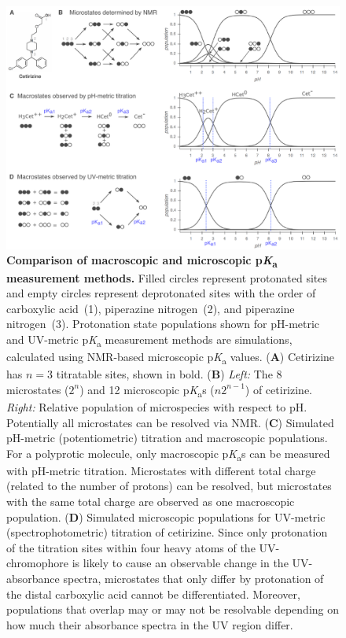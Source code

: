 \documentclass[9pt,lineno]{elife}
\newcommand{\pKa}{p\textit{K}\textsubscript{a}}
\begin{document}
\begin{figure}
\begin{center}
\includegraphics[width=1.00\linewidth]{figures/microscopic_vs_macroscopic_populations_figure.pdf}
\caption{{\bf Comparison of macroscopic and microscopic \pKa{} measurement methods.}  
Filled circles represent protonated sites and empty circles represent deprotonated sites with the order of carboxylic acid~(1), piperazine nitrogen~(2), and piperazine nitrogen~(3). 
Protonation state populations shown for pH-metric and UV-metric \pKa{} measurement methods are simulations, calculated using NMR-based microscopic \pKa{} values.
(\textbf{A}) Cetirizine has $n = $3 titratable sites, shown in bold. 
(\textbf{B}) \emph{Left:} The 8 microstates ($2^n$) and 12 microscopic \pKa{}s ($n 2^{n-1}$) of cetirizine. 
\emph{Right:} Relative population of microspecies with respect to pH. 
Potentially all microstates can be resolved via NMR. 
(\textbf{C}) Simulated pH-metric (potentiometric) titration and macroscopic populations. 
For a polyprotic molecule, only macroscopic \pKa{}s can be measured with pH-metric titration. 
Microstates with different total charge (related to the number of protons) can be resolved, but microstates with the same total charge are observed as one macroscopic population. 
(\textbf{D}) Simulated microscopic populations for UV-metric (spectrophotometric) titration of cetirizine. 
Since only protonation of the titration sites within four heavy atoms of the UV-chromophore is likely to cause an observable change in the UV-absorbance spectra, microstates that only differ by protonation of the distal carboxylic acid cannot be differentiated. 
Moreover, populations that overlap may or may not be resolvable depending on how much their absorbance spectra in the UV region differ. 
}
\end{center}
\end{figure}
\end{document}
